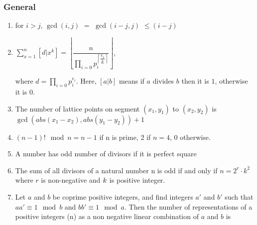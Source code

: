 \begin{enumerate}

            \end{enumerate}
\subsubsection{General}\begin{enumerate}

            \item for $i > j$, $\displaystyle \gcd(i, j)$ $ = $ $\displaystyle \gcd(i -j, j)$ $\displaystyle \leq (i
                -j)$
            
            \item 
                $\displaystyle \sum_{x = 1}^n \left[ d | x^k \right] = \left \lfloor\dfrac{n}{\prod_{i =
                    0}{p_i^{\left
                    \lceil
                    \dfrac{e_i}{k}\right \rceil}}}\right \rfloor$,

                where $d = \prod_{i = 0}{p_i^{e_i}}$. Here, $[a | b]$ means if $\displaystyle a$ divides $b$ then it
                    is
                    $\displaystyle 1$, otherwise it is $0$.

            
            \item The number of lattice points on segment $\displaystyle (x_1,y_1)$ to $\displaystyle (x_2,y_2)$ is
                $\displaystyle
                \gcd(abs(x_1-x_2),abs(y_1-y_2)) + 1$
            \item $\displaystyle (n-1)! \mod n = n -1$ if n is prime, 2 if $n = 4$, $0$ otherwise.
            \item A number has odd number of divisors if it is perfect square
            \item The sum of all divisors of a natural number n is odd if and only if $n=2^r\cdot k^2$ where $r$ is
                non-negative
                and $\displaystyle \displaystyle k$ is positive integer.
            \item 
                Let $\displaystyle a$ and $b$ be coprime positive integers, and find integers $\displaystyle
                    a{\prime}$
                    and
                    $b{\prime}$ such that $\displaystyle aa{\prime} \equiv 1 \mod b$ and $bb{\prime} \equiv 1 \mod a$.
                    Then
                    the
                    number of representations of a positive integers (n) as a non negative linear combination of
                    $\displaystyle
                    a$ and $b$ is


\end{enumerate}
